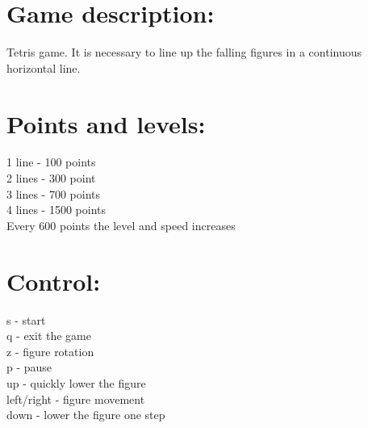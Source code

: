 \documentclass[12pt]{article}
\begin{document}
\section{Game description:}

Tetris game. It is necessary to line up the falling figures in a continuous horizontal line.

\section{Points and levels:}

1 line - 100 points
\\
2 lines - 300 point
\\
3 lines - 700 points
\\
4 lines - 1500 points
\\
Every 600 points the level and speed increases


\section{Control:}

s - start
\\
q - exit the game
\\
z - figure rotation
\\
p - pause
\\
up - quickly lower the figure
\\
left/right - figure movement
\\
down - lower the figure one step
\end{document}
